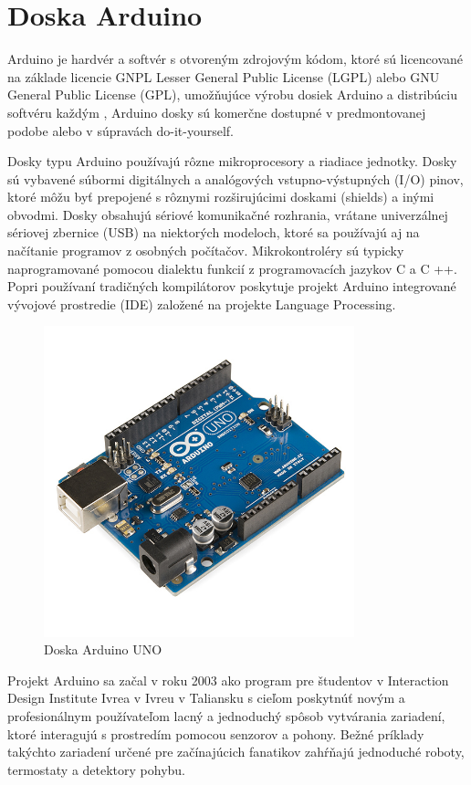 \chapter{Doska Arduino}

Arduino je hardvér a softvér s otvoreným zdrojovým kódom, ktoré sú licencované na základe licencie GNPL Lesser General Public License (LGPL) alebo GNU General Public License (GPL), umožňujúce výrobu dosiek Arduino a distribúciu softvéru každým , Arduino dosky sú komerčne dostupné v predmontovanej podobe alebo v súpravách do-it-yourself.

Dosky typu Arduino používajú rôzne mikroprocesory a riadiace jednotky. Dosky sú vybavené súbormi digitálnych a analógových vstupno-výstupných (I/O) pinov, ktoré môžu byť prepojené s rôznymi rozširujúcimi doskami (shields) a inými obvodmi. Dosky obsahujú sériové komunikačné rozhrania, vrátane univerzálnej sériovej zbernice (USB) na niektorých modeloch, ktoré sa používajú aj na načítanie programov z osobných počítačov. Mikrokontroléry sú typicky naprogramované pomocou dialektu funkcií z programovacích jazykov C a C ++. Popri používaní tradičných kompilátorov poskytuje projekt Arduino integrované vývojové prostredie (IDE) založené na projekte Language Processing.

\begin{figure}[H]
	\begin{center}
		\includegraphics[height=9cm]{pics/arduino.jpg}
		\caption{Doska Arduino UNO}
		\label{pic-reference}
	\end{center}
\end{figure}


Projekt Arduino sa začal v roku 2003 ako program pre študentov v Interaction Design Institute Ivrea v Ivreu v Taliansku s cieľom poskytnúť novým a profesionálnym používateľom lacný a jednoduchý spôsob vytvárania zariadení, ktoré interagujú s prostredím pomocou senzorov a pohony. Bežné príklady takýchto zariadení určené pre začínajúcich fanatikov zahŕňajú jednoduché roboty, termostaty a detektory pohybu.

